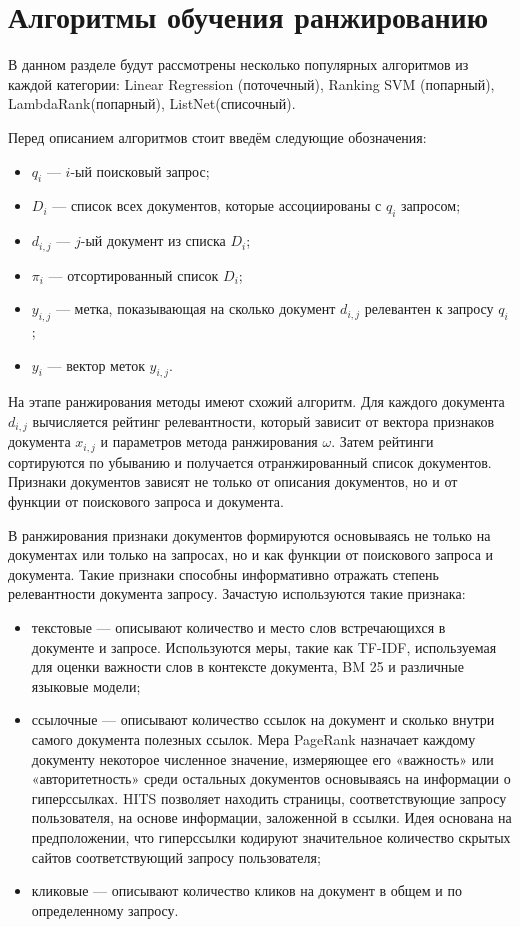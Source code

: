 \section{Алгоритмы обучения ранжированию}

В данном разделе будут рассмотрены несколько популярных алгоритмов из каждой категории: Linear Regression (поточечный), Ranking SVM (попарный), LambdaRank(попарный), ListNet(списочный). 

Перед описанием алгоритмов стоит введём следующие обозначения:
\begin{itemize}[label=---]
	\item $q_{i}$ --- $i$-ый поисковый запрос;
	\item $D_{i}$ --- список всех документов, которые ассоциированы с $q_{i}$ запросом;
	\item $d_{i,j}$ --- $j$-ый документ из списка $D_{i}$;
	\item $\pi_{i}$ --- отсортированный список $D_{i}$;
	\item $y_{i,j}$ --- метка, показывающая на сколько документ $d_{i,j}$ релевантен к запросу $q_{i}$;
	\item $y_{i}$ --- вектор меток $y_{i,j}$.
\end{itemize}

На этапе ранжирования методы имеют схожий алгоритм. Для каждого документа $d_{i,j}$ вычисляется рейтинг релевантности, который зависит от вектора признаков документа $x_{i,j}$ и параметров метода ранжирования $\omega$. Затем рейтинги сортируются по убыванию и получается отранжированный список документов. Признаки документов зависят не только от описания документов, но и от функции от поискового запроса и
документа.

В ранжирования признаки документов формируются основываясь не только на документах или только на запросах, но и как функции от поискового запроса и документа. Такие признаки способны информативно отражать степень релевантности документа запросу. Зачастую используются такие признака:
\begin{itemize}[label=---]
	\item текстовые --- описывают количество и место слов встречающихся в документе и запросе. Используются меры, такие как TF-IDF, используемая для оценки важности слов в контексте документа, BM 25 и различные языковые модели;
	\item ссылочные --- описывают количество ссылок на документ и сколько внутри самого документа полезных ссылок. Мера PageRank назначает каждому документу некоторое численное значение, измеряющее его «важность» или «авторитетность» среди остальных документов основываясь на информации о гиперссылках.  HITS позволяет находить страницы, соответствующие запросу пользователя, на основе информации, заложенной в ссылки. Идея основана на предположении, что гиперссылки кодируют значительное количество скрытых сайтов соответствующий запросу пользователя;
	\item кликовые --- описывают количество кликов на документ в общем и по определенному запросу. 
\end{itemize}

